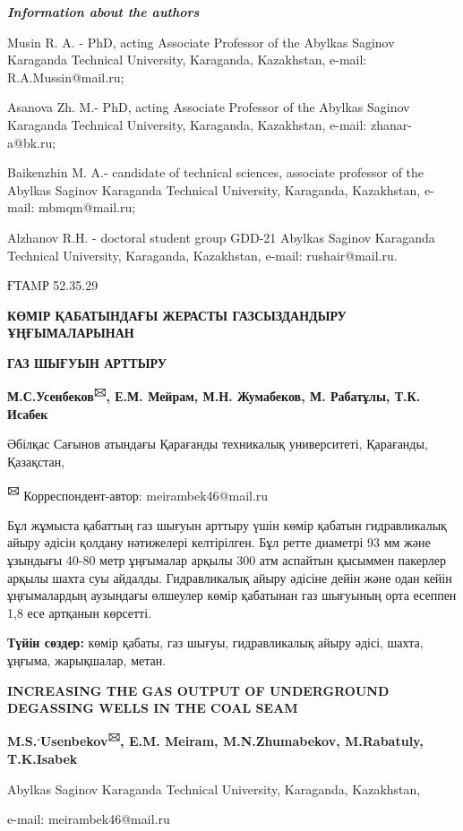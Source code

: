 \emph{{\bfseries Information about the authors}}

Musin R. A. - PhD, acting Associate Professor of the Abylkas Saginov
Karaganda Technical University, Karaganda, Kazakhstan, e-mail:
R.A.Mussin@mail.ru;

Asanova Zh. M.- PhD, acting Associate Professor of the Abylkas Saginov
Karaganda Technical University, Karaganda, Kazakhstan, e-mail:
zhanar-a@bk.ru;

Baikenzhin M. A.- candidate of technical sciences, associate professor
of the Abylkas Saginov Karaganda Technical University, Karaganda,
Kazakhstan, e-mail: mbmqm@mail.ru;

Alzhanov R.H. - doctoral student group GDD-21 Abylkas Saginov Karaganda
Technical University, Karaganda, Kazakhstan, e-mail: rushair@mail.ru.

{\bfseries \hfill\break
}

ҒТАMР 52.35.29

{\bfseries КӨМІР ҚАБАТЫНДАҒЫ ЖЕРАСТЫ ГАЗСЫЗДАНДЫРУ ҰҢҒЫМАЛАРЫНАН}

{\bfseries ГАЗ ШЫҒУЫН АРТТЫРУ}

{\bfseries М.С.Усенбеков\textsuperscript{🖂}, Е.М. Мейрам, М.Н. Жумабеков,
М. Рабатұлы, Т.К. Исабек}

Әбілқас Сағынов атындағы Қарағанды техникалық университеті, Қарағанды,
Қазақстан,

{\bfseries \textsuperscript{🖂}} Корреспондент-автор: meirambek46@mail.ru

Бұл жұмыста қабаттың газ шығуын арттыру үшін көмір қабатын гидравликалық
айыру әдісін қолдану нәтижелері келтірілген. Бұл ретте диаметрі 93 мм
және ұзындығы 40-80 метр ұңғымалар арқылы 300 атм аспайтын қысыммен
пакерлер арқылы шахта суы айдалды. Гидравликалық айыру әдісіне дейін
және одан кейін ұңғымалардың аузындағы өлшеулер көмір қабатынан газ
шығуының орта есеппен 1,8 есе артқанын көрсетті.

{\bfseries Түйін сөздер:} көмір қабаты, газ шығуы, гидравликалық айыру
әдісі, шахта, ұңғыма, жарықшалар, метан.

{\bfseries INCREASING THE GAS OUTPUT OF UNDERGROUND DEGASSING WELLS IN THE
COAL SEAM}

{\bfseries M.S.\textsuperscript{.}Usenbekov\textsuperscript{🖂}, E.M.
Meiram, M.N.Zhumabekov, M.Rabatuly, T.K.Isabek}

Abylkas Saginov Karaganda Technical University, Karaganda, Kazakhstan,

e-mail: meirambek46@mail.ru

